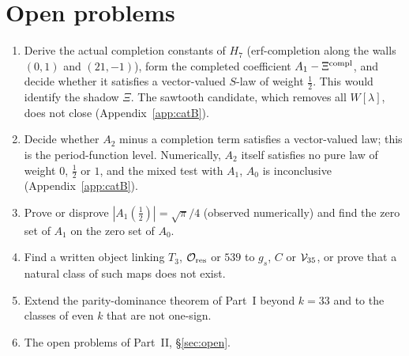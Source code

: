 \section{Open problems}\label{sec:gopen}
\begin{enumerate}[label=\arabic*.,leftmargin=2em]
\item\label{op:xi} Derive the actual completion constants of $H_7$ (erf-completion along the walls $(0,1)$ and $(21,-1)$), form the completed coefficient $A_1-\Xi^{\rm compl}$, and
decide whether it satisfies a vector-valued $S$-law of weight $\frac12$. This would identify the shadow $\Xi$. The sawtooth candidate, which removes all $W[\lambda]$, does not close (Appendix~\ref{app:catB}).
\item Decide whether $A_2$ minus a completion term satisfies a vector-valued law; this is the period-function level. Numerically, $A_2$ itself satisfies no pure law of weight $0$, $\frac12$ or $1$, and the mixed test with $A_1$, $A_0$ is inconclusive (Appendix~\ref{app:catB}).
\item Prove or disprove $|A_1(\frac12)|=\sqrt\pi/4$ (observed numerically) and find the zero set of $A_1$ on the zero set of $A_0$.
\item Find a written object linking $T_3$, $\mathcal O_{\rm res}$ or $539$ to $g_s$, $C$ or $\mathcal V_{35}$, or prove that a natural class of such maps does not exist.
\item Extend the parity-dominance theorem of Part~I beyond $k=33$ and to the classes of even $k$ that are not one-sign.
\item The open problems of Part~II, \S\ref{sec:open}.
\end{enumerate}
